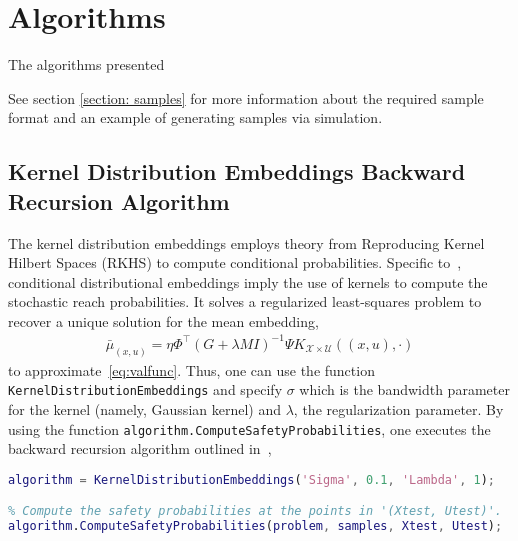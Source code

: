 \documentclass[11pt]{article}
\begin{document}

\section{Algorithms}
\label{section: algorithms}

The algorithms presented

See section \ref{section: samples} for more information about the required sample format and an example of generating samples via simulation.


\subsection{Kernel Distribution Embeddings Backward Recursion Algorithm}

The kernel distribution embeddings employs theory from Reproducing Kernel Hilbert Spaces (RKHS) to compute conditional probabilities. Specific to~\cite{thorpe2019stochastic}, conditional distributional embeddings imply the use of kernels to compute the stochastic reach probabilities. It solves a regularized least-squares problem to recover a unique solution for the mean embedding,
\begin{align}
	\bar{\mu}_{(x, u)} =
  \eta
	\Phi^{\top}
	(G + \lambda M I)^{-1}
	\Psi
	K_{\mathcal{X} \times \mathcal{U}}((x, u), \cdot)
  \label{eqn: estimate mu bar}
\end{align}
to approximate~\eqref{eq:valfunc}. Thus, one can use the function \texttt{KernelDistributionEmbeddings} and specify $\sigma$ which is the bandwidth parameter for the kernel (namely, Gaussian kernel) and $\lambda$, the regularization parameter. By using the function \texttt{algorithm.ComputeSafetyProbabilities}, one executes the backward recursion algorithm outlined in~\cite[Alg. 1]{thorpe2019stochastic},
\begin{lstlisting}[language=Matlab]
% Define the algorithm Kernel Distribution Embeddings
algorithm = KernelDistributionEmbeddings('Sigma', 0.1, 'Lambda', 1);

% Compute the safety probabilities at the points in '(Xtest, Utest)'.
algorithm.ComputeSafetyProbabilities(problem, samples, Xtest, Utest);
\end{lstlisting}


\end{document}
